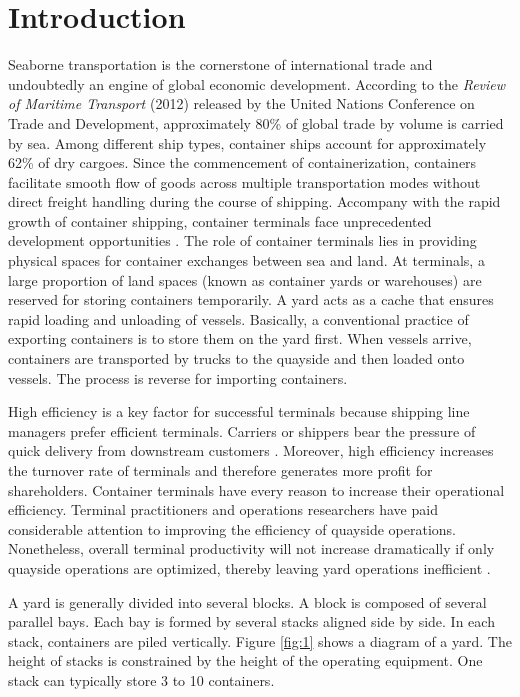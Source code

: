 \documentclass[review,3p,times,authoryear,12pt]{elsarticle}
\begin{document}
\section{Introduction}

Seaborne transportation is the cornerstone of international trade and undoubtedly an engine of global economic development.
According to the \textit{Review of Maritime Transport} (2012) released by the United Nations Conference on Trade and Development, approximately 80\% of global trade by volume is carried by sea.
Among different ship types, container ships account for approximately 62\% of dry cargoes.
Since the commencement of containerization, containers facilitate smooth flow of goods across multiple transportation modes without direct freight handling during the course of shipping.
Accompany with the rapid growth of container shipping, container terminals face unprecedented development opportunities \citep{Farahani2014}.
The role of container terminals lies in providing physical spaces for container exchanges between sea and land.
At terminals, a large proportion of land spaces (known as container yards or warehouses) are reserved for storing containers temporarily.
A yard acts as a cache that ensures rapid loading and unloading of vessels.
Basically, a conventional practice of exporting containers is to store them on the yard first.
When vessels arrive, containers are transported by trucks to the quayside and then loaded onto vessels.
The process is reverse for importing containers.

High efficiency is a key factor for successful terminals because shipping line managers prefer efficient terminals.
Carriers or shippers bear the pressure of quick delivery from downstream customers \citep{Aguezzoul2014}.
Moreover, high efficiency increases the turnover rate of terminals and therefore generates more profit for shareholders.
Container terminals have every reason to increase their operational efficiency.
Terminal practitioners and operations researchers have paid considerable attention to improving the efficiency of quayside operations.
Nonetheless, overall terminal productivity will not increase dramatically if only quayside operations are optimized, thereby leaving yard operations inefficient \citep{Jiang2012}.

A yard is generally divided into several blocks.
A block is composed of several parallel bays.
Each bay is formed by several stacks aligned side by side.
In each stack, containers are piled vertically.
Figure \ref{fig:1} shows a diagram of a yard.
The height of stacks is constrained by the height of the operating equipment.
One stack can typically store 3 to 10 containers.
\end{document}
